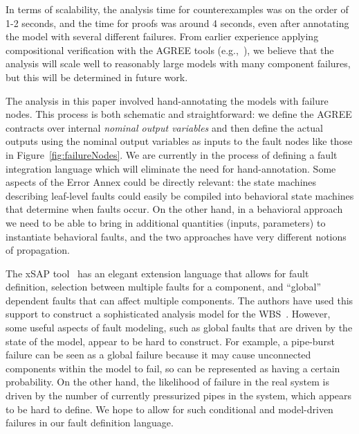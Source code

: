 In terms of scalability, the analysis time for counterexamples was on the order of 1-2 seconds, and the time for proofs was around 4 seconds, even after annotating the model with several different failures.  From earlier experience applying compositional verification with the AGREE tools (e.g.,~\cite{QFCS15:backes,hilt2013}), we believe that the analysis will scale well to reasonably large models with many component failures, but this will be determined in future work.

The analysis in this paper involved hand-annotating the models with failure nodes.  This process is both schematic and straightforward: we define the AGREE contracts over internal {\em nominal output variables} and then define the actual outputs using the nominal output variables as inputs to the fault nodes like those in Figure~\ref{fig:failureNodes}.   We are currently in the process of defining a fault integration language which will eliminate the need for hand-annotation.  Some aspects of the Error Annex could be directly relevant: the state machines describing leaf-level faults could easily be compiled into behavioral state machines that determine when faults occur.  On the other hand, in a behavioral approach we need to be able to bring in additional quantities (inputs, parameters) to instantiate behavioral faults, and the two approaches have very different notions of propagation.

The xSAP tool~\cite{DBLP:conf/tacas/BittnerBCCGGMMZ16} has an elegant extension language that allows for fault definition, selection between multiple faults for a component, and ``global'' dependent faults that can affect multiple components.  The authors have used this support to construct a sophisticated analysis model for the WBS~\cite{DBLP:conf/cav/BozzanoCPJKPRT15}.  However, some useful aspects of fault modeling, such as global faults that are driven by the state of the model, appear to be hard to construct.  For example, a pipe-burst failure can be seen as a global failure because it may cause unconnected components within the model to fail, so can be represented as having a certain probability.  On the other hand, the likelihood of failure in the real system is driven by the number of currently pressurized pipes in the system, which appears to be hard to define.  We hope to allow for such conditional and model-driven failures in our fault definition language.



